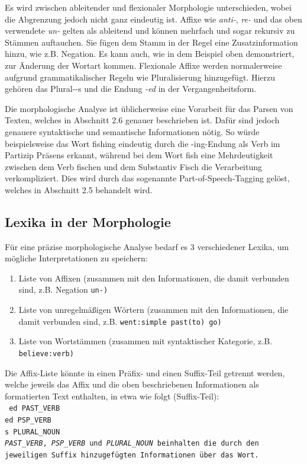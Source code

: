 \documentclass[12pt]{report}
\begin{document}
Es wird zwischen ableitender und flexionaler Morphologie unterschieden, wobei die Abgrenzung jedoch nicht ganz eindeutig ist. Affixe wie \textit{\glqq  anti-\grqq{}}, \textit{\glqq  re-\grqq{}} und das oben verwendete \textit{\glqq  un-\grqq{}} gelten als ableitend und können mehrfach und sogar rekursiv zu Stämmen auftauchen. Sie fügen dem Stamm in der Regel eine Zusatzinformation hinzu, wie z.B. Negation. Es kann auch, wie in dem Beispiel oben demonstriert, zur Änderung der Wortart kommen. Flexionale Affixe werden normalerweise aufgrund grammatikalischer Regeln wie Pluralisierung hinzugefügt. Hierzu gehören das Plural-\glqq  -s\grqq{} und die Endung \textit{\glqq  -ed\grqq{}} in der Vergangenheitsform. 

Die morphologische Analyse ist üblicherweise eine Vorarbeit für das Parsen von Texten, welches in Abschnitt 2.6 genauer beschrieben ist. Dafür sind jedoch genauere syntaktische und semantische Informationen nötig. So würde beispielsweise das Wort \glqq  fishing\grqq{} eindeutig durch die \glqq  -ing\grqq{}-Endung als Verb im Partizip Präsens erkannt, während bei dem Wort \glqq  fish\grqq{} eine Mehrdeutigkeit zwischen dem Verb \glqq  fischen\grqq{} und dem Substantiv \glqq  Fisch\grqq{} die Verarbeitung verkompliziert. Dies wird durch das sogenannte Part-of-Speech-Tagging gelöst, welches in Abschnitt 2.5 behandelt wird.

\subsection{Lexika in der Morphologie}
Für eine präzise morphologische Analyse bedarf es 3 verschiedener Lexika, um mögliche Interpretationen zu speichern:

\begin{enumerate}
\item Liste von Affixen (zusammen mit den Informationen, die damit verbunden sind, z.B. Negation \tt \glqq  un-\grqq{}\rm)
\item Liste von unregelmäßigen Wörtern (zusammen mit den Informationen, die damit verbunden sind, z.B. \tt \glqq  went\grqq{}:simple past\glqq  (to) go\grqq{}\rm)
\item Liste von Wortstämmen (zusammen mit syntaktischer Kategorie, z.B. \tt \glqq  believe\grqq{}:verb\rm)
\end{enumerate}

Die Affix-Liste könnte in einen Präfix- und einen Suffix-Teil getrennt werden, welche jeweils das Affix und die oben beschriebenen Informationen als formatierten Text enthalten, in etwa wie folgt (Suffix-Teil):
\\
\tt
ed PAST\_VERB\\
ed PSP\_VERB\\
s PLURAL\_NOUN\\
\rm
\textit{PAST\_VERB}, \textit{PSP\_VERB} und \textit{PLURAL\_NOUN} beinhalten die durch den jeweiligen Suffix hinzugefügten Informationen über das Wort. 
\end{document}
